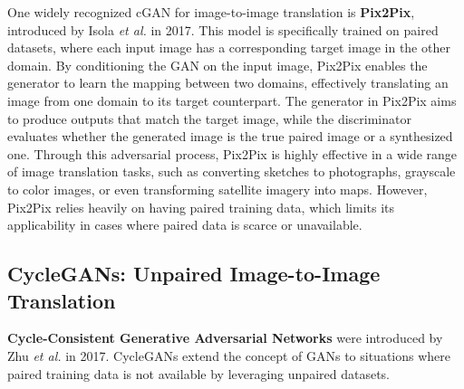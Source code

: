 \documentclass[12pt,DIV14,BCOR12mm,a4paper,footinclude=false,headinclude,parskip=half-,twoside,openright,cleardoublepage=empty,toc=index,bibliography=totoc,listof=totoc]{scrreprt}
\numberwithin{equation}{chapter}
\begin{document}
One widely recognized cGAN for image-to-image translation is \textbf{Pix2Pix}, introduced by Isola \textit{et al.} in 2017\cite{isola2017image}. This model is specifically trained on paired datasets, where each input image has a corresponding target image in the other domain. By conditioning the GAN on the input image, Pix2Pix enables the generator to learn the mapping between two domains, effectively translating an image from one domain to its target counterpart. The generator in Pix2Pix aims to produce outputs that match the target image, while the discriminator evaluates whether the generated image is the true paired image or a synthesized one. Through this adversarial process, Pix2Pix is highly effective in a wide range of image translation tasks, such as converting sketches to photographs\cite{sangkloy2017scribbler}, grayscale to color images, or even transforming satellite imagery into maps. However, Pix2Pix relies heavily on having paired training data, which limits its applicability in cases where paired data is scarce or unavailable.
\subsection{CycleGANs: Unpaired Image-to-Image Translation}
\textbf{Cycle-Consistent Generative Adversarial Networks} were introduced by Zhu \textit{et al.} in 2017. CycleGANs extend the concept of GANs to situations where paired training data is not available by leveraging unpaired datasets\cite{zhu2017unpaired}.
\end{document}

